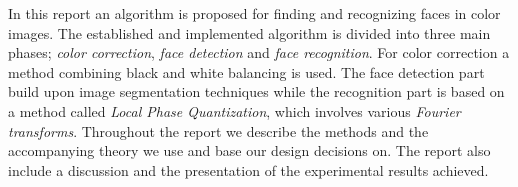 In this report an algorithm is proposed for finding and recognizing faces in color images. The established and implemented algorithm is divided into three main phases; \textit{color correction}, \textit{face detection} and \textit{face recognition}. For color correction a method combining black and white balancing is used. The face detection part build upon image segmentation techniques while the recognition part is based on a method called \textit{Local Phase Quantization}, which involves various \textit{Fourier transforms}. Throughout the report we describe the methods and the accompanying theory we use and base our design decisions on. The report also include a discussion and the presentation of the experimental results achieved. 
